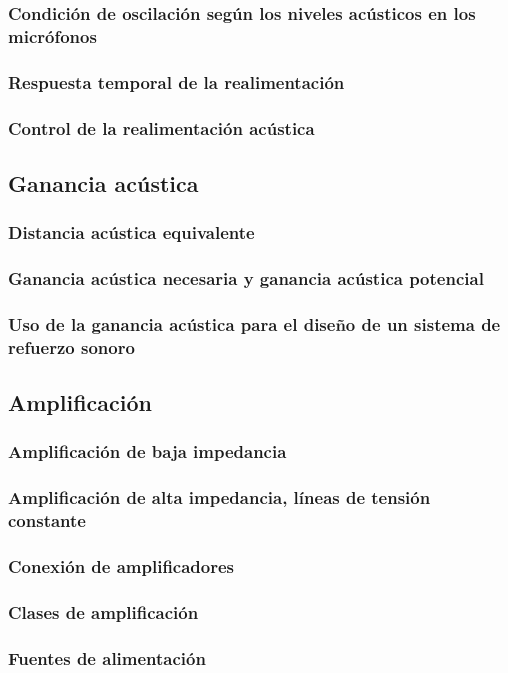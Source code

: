 \documentclass[a4paper, 8pt]{extarticle}
\begin{document}
\begin{multicols}{3}
  \subsubsection{Condición de oscilación según los niveles acústicos en los micrófonos}
  \subsubsection{Respuesta temporal de la realimentación}
  \subsubsection{Control de la realimentación acústica}

  \subsection{Ganancia acústica}
  \subsubsection{Distancia acústica equivalente}
  \subsubsection{Ganancia acústica necesaria y ganancia acústica potencial}
  \subsubsection{Uso de la ganancia acústica para el diseño de un sistema de refuerzo sonoro}
  \subsection{Amplificación}
  \subsubsection{Amplificación de baja impedancia}
  \subsubsection{Amplificación de alta impedancia, líneas de tensión constante}
  \subsubsection{Conexión de amplificadores}
  \subsubsection{Clases de amplificación}
  \subsubsection{Fuentes de alimentación}

\end{multicols}
\end{document}
